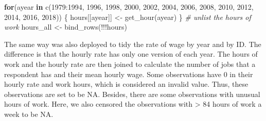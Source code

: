 \documentclass{article}
\newenvironment{Shaded}{\begin{snugshade}}{\end{snugshade}}
\newcommand{\CommentTok}[1]{\textcolor[rgb]{0.56,0.35,0.01}{\textit{#1}}}
\newcommand{\ControlFlowTok}[1]{\textcolor[rgb]{0.13,0.29,0.53}{\textbf{#1}}}
\newcommand{\DecValTok}[1]{\textcolor[rgb]{0.00,0.00,0.81}{#1}}
\newcommand{\FunctionTok}[1]{\textcolor[rgb]{0.00,0.00,0.00}{#1}}
\newcommand{\NormalTok}[1]{#1}
\newcommand{\OtherTok}[1]{\textcolor[rgb]{0.56,0.35,0.01}{#1}}
\newcommand{\SpecialCharTok}[1]{\textcolor[rgb]{0.00,0.00,0.00}{#1}}
\begin{document}
\begin{Shaded}
\begin{Highlighting}[]
\ControlFlowTok{for}\NormalTok{(ayear }\ControlFlowTok{in} \FunctionTok{c}\NormalTok{(}\DecValTok{1979}\SpecialCharTok{:}\DecValTok{1994}\NormalTok{, }\DecValTok{1996}\NormalTok{, }\DecValTok{1998}\NormalTok{, }\DecValTok{2000}\NormalTok{, }\DecValTok{2002}\NormalTok{, }\DecValTok{2004}\NormalTok{, }\DecValTok{2006}\NormalTok{, }\DecValTok{2008}\NormalTok{, }\DecValTok{2010}\NormalTok{,}
               \DecValTok{2012}\NormalTok{, }\DecValTok{2014}\NormalTok{, }\DecValTok{2016}\NormalTok{, }\DecValTok{2018}\NormalTok{)) \{}
\NormalTok{  hours[[ayear]] }\OtherTok{\textless{}{-}} \FunctionTok{get\_hour}\NormalTok{(ayear)}
\NormalTok{\}}
\CommentTok{\# unlist the hours of work}
\NormalTok{hours\_all }\OtherTok{\textless{}{-}} \FunctionTok{bind\_rows}\NormalTok{(}\SpecialCharTok{!!!}\NormalTok{hours)}
\end{Highlighting}
\end{Shaded}

The same way was also deployed to tidy the rate of wage by year and by ID. The difference is that the hourly rate has only one version of each year. The hours of work and the hourly rate are then joined to calculate the number of jobs that a respondent has and their mean hourly wage. Some observations have 0 in their hourly rate and work hours, which is considered an invalid value. Thus, these observations are set to be NA. Besides, there are some observations with unusual hours of work. Here, we also censored the observations with \textgreater{} 84 hours of work a week to be NA.
\end{document}
